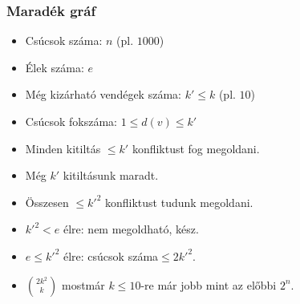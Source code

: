 \begin{frame}
\frametitle{Maradék gráf}

\begin{footnotesize}
\begin{itemize}
\item Csúcsok száma: $n$ (pl. $1000$)
\item Élek száma: $e$
\item Még kizárható vendégek száma: $k'\leq{}k$ (pl. $10$)
\item Csúcsok fokszáma: $1\leq{}d(v)\leq{}k'$
\end{itemize}
\end{footnotesize}

\begin{itemize}
\item Minden kitiltás $\leq{}k'$ konfliktust fog megoldani.\pause
\item Még $k'$ kitiltásunk maradt.\pause
\item Összesen $\leq{}k'^2$ konfliktust tudunk megoldani.\pause
\item $k'^2<e$ élre: nem megoldható, kész.\pause
\item $e\leq{}k'^2$ élre: csúcsok száma$\leq{}2k'^2$.\pause
\item ${2k^2 \choose k}$ mostmár $k\leq{}10$-re már jobb mint az előbbi $2^n$.
\end{itemize}
\end{frame}
